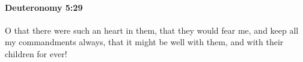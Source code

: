 
		\paragraph{Deuteronomy 5:29} %
			\label{DEUTERONOMY-5-29}

			O that there were such an heart in them, that they would fear me, and keep all my commandments always, that it might be well with them, and with their children for ever!


